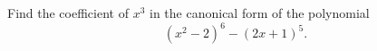 Find the coefficient of $x^{3}$ in the canonical form of the polynomial \[(x^{2}-2)^{6}-(2x+1)^{5}.\]
